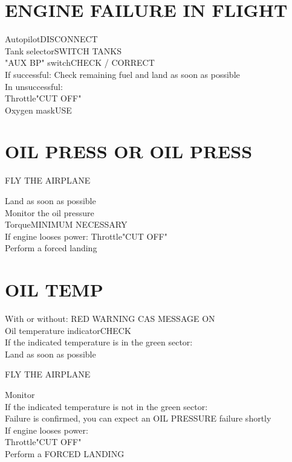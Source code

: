 \documentclass{article}
\newcommand{\fly}{\vspace{-1em}\begin{center}\color{Green}FLY THE AIRPLANE\end{center}\vspace{-1em}}
\newcommand{\warning}[1]{\colorbox{Black}{\color{Orange}{#1}}}
\begin{document}
\begin{multicols*}{2}
\section*{ENGINE FAILURE IN FLIGHT}
Autopilot\dotfill DISCONNECT\\
Tank selector\dotfill SWITCH TANKS\\
"AUX BP" switch\dotfill CHECK / CORRECT\\
If successful: Check remaining fuel and land as soon as possible\\
In unsuccessful:\\
Throttle\dotfill "CUT OFF"\\
Oxygen mask\dotfill USE\\
\vspace{-1em}
\section*{\color{Red}OIL PRESS \color{White} OR \color{Orange}OIL PRESS}
\vspace{1em}\fly
Land as soon as possible\\
Monitor the oil pressure\\
Torque\dotfill MINIMUM NECESSARY\\
If engine looses power:
Throttle\dotfill "CUT OFF"\\
Perform a forced landing
\section*{\color{Orange}OIL TEMP}
With or without: RED WARNING CAS MESSAGE \warning{OIL PRESS} ON\\
Oil temperature indicator\dotfill CHECK\\
If the indicated temperature is in the green sector:\\
Land as soon as possible
\fly
Monitor\\
If the indicated temperature is not in the green sector:\\
Failure is confirmed, you can expect an OIL PRESSURE failure shortly\\
If engine looses power:\\
Throttle\dotfill "CUT OFF"\\
Perform a FORCED LANDING
\vfill\null

\end{multicols*}
\end{document}
